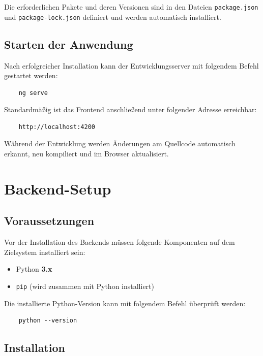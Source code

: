 Die erforderlichen Pakete und deren Versionen sind in den Dateien \texttt{package.json} und \texttt{package-lock.json} definiert und werden automatisch installiert.

\subsection{Starten der Anwendung}

Nach erfolgreicher Installation kann der Entwicklungsserver mit folgendem Befehl gestartet werden:

\begin{verbatim}
	ng serve
\end{verbatim}

Standardmäßig ist das Frontend anschließend unter folgender Adresse erreichbar:

\begin{verbatim}
	http://localhost:4200
\end{verbatim}

Während der Entwicklung werden Änderungen am Quellcode automatisch erkannt, neu kompiliert und im Browser aktualisiert.

\section{Backend-Setup}

\subsection{Voraussetzungen}

Vor der Installation des Backends müssen folgende Komponenten auf dem Zielsystem installiert sein:

\begin{itemize}
	\item Python \textbf{3.x}
	\item \texttt{pip} (wird zusammen mit Python installiert)
\end{itemize}

Die installierte Python-Version kann mit folgendem Befehl überprüft werden:

\begin{verbatim}
	python --version
\end{verbatim}

\subsection{Installation}

